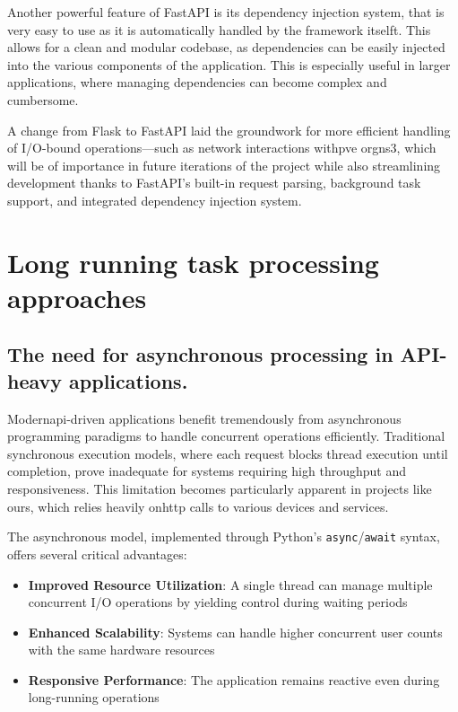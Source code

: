       Another powerful feature of FastAPI is its dependency injection system, that is very easy to use as it is automatically
      handled by the framework itselft. This allows for a clean and modular codebase, as dependencies can be easily injected into
      the various components of the application. This is especially useful in larger applications, where managing dependencies
      can become complex and cumbersome.
      
      A change from Flask to FastAPI laid the groundwork for more efficient handling of I/O-bound operations—such as network interactions 
      with\ac{pve} or\ac{gns3}, which will be of importance in future iterations of the project while also streamlining development thanks 
      to FastAPI's built-in request parsing, background task support, and integrated dependency injection system.

\section{Long running task processing approaches}

  \subsection{The need for asynchronous processing in API-heavy applications.}
    Modern\ac{api}-driven applications benefit tremendously from asynchronous programming paradigms to handle concurrent operations 
    efficiently. Traditional synchronous execution models, where each request blocks thread execution until completion, prove 
    inadequate for systems requiring high throughput and responsiveness. This limitation becomes particularly apparent in projects 
    like ours, which relies heavily on\ac{http} calls to various devices and services.

    The asynchronous model, implemented through Python's \texttt{async}/\texttt{await} syntax, offers several critical advantages:

    \begin{itemize}
        \item \textbf{Improved Resource Utilization}: A single thread can manage multiple concurrent I/O operations by yielding control during waiting periods
        \item \textbf{Enhanced Scalability}: Systems can handle higher concurrent user counts with the same hardware resources
        \item \textbf{Responsive Performance}: The application remains reactive even during long-running operations
    \end{itemize}

